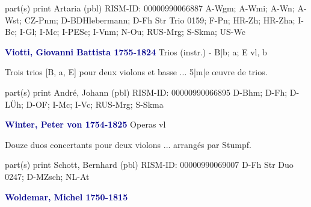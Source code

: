 \documentclass[twocolumn]{book}
\begin{document}
\newline \textcolor{darkblue}{}  part(s)
\newline print
\newline Artaria  (pbl)
\newline RISM-ID: 00000990066887
\newline A-Wgm; A-Wmi; A-Wn; A-Wst; CZ-Pnm; D-BDHlebermann; D-Fh  Str Trio 0159; F-Pn; HR-Zh; HR-Zha; I-Bc; I-Gl; I-Mc; I-PESc; I-Vnm; N-Ou; RUS-Mrg; S-Skma; US-Wc
\newline \par \vspace{7pt} \textcolor{darkblue}{\textbf{Viotti, Giovanni Battista  1755-1824}}
\newline Trios (instr.) - B|b; a; E
 vl, b
\newline \begin{itshape}Trois trios [B, a, E] pour deux violons et basse ... 5|m|e œuvre de trios.\end{itshape} 
\newline \textcolor{darkblue}{}  part(s)
\newline print
\newline André, Johann  (pbl)
\newline RISM-ID: 00000990066895
\newline D-Bhm; D-Fh; D-LÜh; D-OF; I-Mc; I-Vc; RUS-Mrg; S-Skma
\newline \par \vspace{7pt} \textcolor{darkblue}{\textbf{Winter, Peter von  1754-1825}}
\newline Operas
 vl
\newline \begin{itshape}Douze duos concertants pour deux violons ... arrangés par Stumpf.\end{itshape} 
\newline \textcolor{darkblue}{}  part(s)
\newline print
\newline Schott, Bernhard  (pbl)
\newline RISM-ID: 00000990069007
\newline D-Fh  Str Duo 0247; D-MZsch; NL-At
\newline \par \vspace{7pt} \textcolor{darkblue}{\textbf{Woldemar, Michel  1750-1815}}
\end{document}
